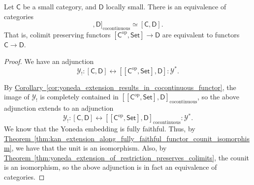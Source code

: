 \documentclass[main.tex]{subfiles}
\begin{document}
\begin{corollary}
  Let $\mathsf{C}$ be a small category, and $\mathsf{D}$ locally small. There is an equivalence of categories
  \begin{equation*}
    [[\mathsf{C}^{\mathrm{op}}, \mathsf{Set}], \mathsf{D}]_{\mathrm{cocontinuous}} \simeq [\mathsf{C}, \mathsf{D}].
  \end{equation*}
  That is, colimit preserving functors $[\mathsf{C}^{\mathrm{op}}, \mathsf{Set}] \to \mathsf{D}$ are equivalent to functors $\mathsf{C} \to \mathsf{D}$.
\end{corollary}
\begin{proof}
  We have an adjunction
  \begin{equation*}
    \mathcal{Y}_{!}: [\mathsf{C}, \mathsf{D}] \leftrightarrow [[\mathsf{C}^{\mathrm{op}}, \mathsf{Set}], \mathsf{D}] : \mathcal{Y}^{*}.
  \end{equation*}

  By \hyperref[cor:yoneda_extension_results_in_cocontinuous_functor]{Corollary~\ref*{cor:yoneda_extension_results_in_cocontinuous_functor}}, the image of $\mathcal{Y}_{!}$ is completely contained in $[[\mathsf{C}^{\mathrm{op}}, \mathsf{Set}], \mathsf{D}]_{\mathrm{cocontinuous}}$, so the above adjunction extends to an adjunction
  \begin{equation*}
    \mathcal{Y}_{!}: [\mathsf{C}, \mathsf{D}] \leftrightarrow [[\mathsf{C}^{\mathrm{op}}, \mathsf{Set}], \mathsf{D}]_{\mathrm{cocontinuous}} : \mathcal{Y}^{*}.
  \end{equation*}
  We know that the Yoneda embedding is fully faithful. Thus, by \hyperref[thm:kan_extension_along_fully_faithful_functor_counit_isomorphism]{Theorem~\ref*{thm:kan_extension_along_fully_faithful_functor_counit_isomorphism}}, we have that the unit is an isomorphism. Also, by \hyperref[thm:yoneda_extension_of_restriction_preserves_colimits]{Theorem~\ref*{thm:yoneda_extension_of_restriction_preserves_colimits}}, the counit is an isomorphism, so the above adjunction is in fact an equivalence of categories.
\end{proof}
\end{document}
